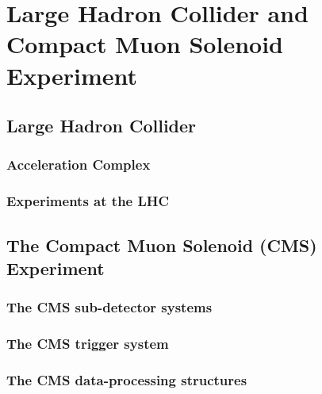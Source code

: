 \chapter{Large Hadron Collider and Compact Muon Solenoid Experiment}

\section{Large Hadron Collider}
\subsection{Acceleration Complex}
\subsection{Experiments at the LHC}

\section{The Compact Muon Solenoid (CMS) Experiment}
\subsection{The CMS sub-detector systems}
\subsection{The CMS trigger system}
\subsection{The CMS data-processing structures}


